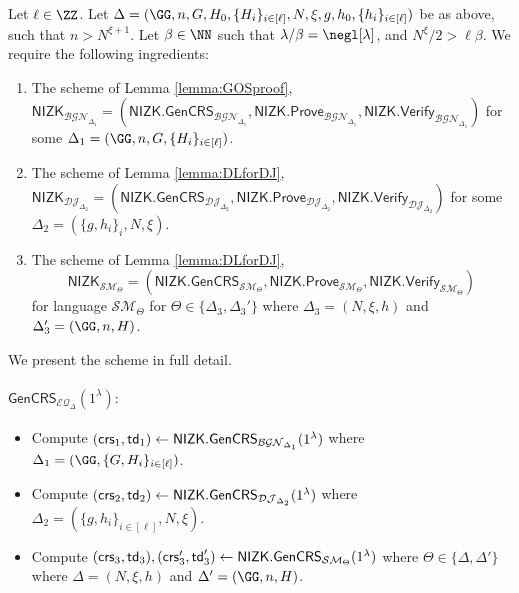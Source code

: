 \begin{construction}
\label{construction:equalityBGNDJ}
Let $\ell\in\ZZ$. Let $\Delta=(\GG,n,G,H_0,\{H_i\}_{i\in[\ell]},N,\xi,g,h_0,\{h_i\}_{i\in [\ell]})$ be as above, such that $n>N^{\xi+1}$. Let $\beta\in\NN$ such that $\lambda/\beta=\negl[\lambda]$, and $N^\xi/2>\ell \beta$. We require the following ingredients:
\begin{enumerate}
    \item The scheme of Lemma \ref{lemma:GOSproof}, $\mathsf{NIZK}_{\mathcal{BGN}_{\Delta_1}}=(\mathsf{NIZK.GenCRS}_{\mathcal{BGN}_{\Delta_1}},\mathsf{NIZK.Prove}_{\mathcal{BGN}_{\Delta_1}},\mathsf{NIZK.Verify}_{\mathcal{BGN}_{\Delta_1}})$ for some $\Delta_1=(\GG,n,G,\{H_i\}_{i\in[\ell]})$.
    \item The scheme of Lemma \ref{lemma:DLforDJ}, $\mathsf{NIZK}_{\mathcal{DJ}_{\Delta_2}}=(\mathsf{NIZK.GenCRS}_{\mathcal{DJ}_{\Delta_2}},\mathsf{NIZK.Prove}_{\mathcal{DJ}_{\Delta_2}},\mathsf{NIZK.Verify}_{\mathcal{DJ}_{\Delta_2}})$ for some $\Delta_2=(\{g,h_i\}_i,N,\xi)$.
   \item The scheme of Lemma \ref{lemma:DLforDJ}, $$\mathsf{NIZK}_{\mathcal{SM}_\Theta}=(\mathsf{NIZK.GenCRS}_{\mathcal{SM}_\Theta},\mathsf{NIZK.Prove}_{\mathcal{SM}_\Theta},\mathsf{NIZK.Verify}_{\mathcal{SM}_\Theta})$$ for language ${\mathcal{SM}_\Theta}$ for $\Theta\in \{\Delta_3,\Delta_3'\}$ where $\Delta_3=(N,\xi,h)$ and $\Delta_3'=(\GG,n,H)$.

\end{enumerate}
We present the scheme in full detail.
\paragraph{$\mathsf{GenCRS}_{\mathcal{EQ}_{\Delta}}(1^\lambda):$}
\begin{itemize}
\item Compute $(\mathsf{crs}_1,\mathsf{td}_1)\leftarrow\mathsf{NIZK.GenCRS}_{\mathcal{BGN}_{\Delta_1}}(1^\lambda)$ where $\Delta_1=(\GG,\{G,H_i\}_{i\in [\ell]})$.
    \item Compute $(\mathsf{crs}_2,\mathsf{td}_2)\leftarrow\mathsf{NIZK.GenCRS}_{\mathcal{DJ}_{\Delta_2}}(1^\lambda)$ where $\Delta_2=(\{g,h_i\}_{i\in [\ell]},N,\xi)$. %
     \item Compute $(\mathsf{crs}_3,\mathsf{td}_3),(\mathsf{crs}'_3,\mathsf{td}'_3)\leftarrow\mathsf{NIZK.GenCRS}_{\mathcal{SM}_\Theta}(1^\lambda)$ where $\Theta\in \{\Delta,\Delta'\}$ where $\Delta=(N,\xi,h)$ and $\Delta'=(\GG,n,H)$.
     

\end{itemize}
\end{construction}

